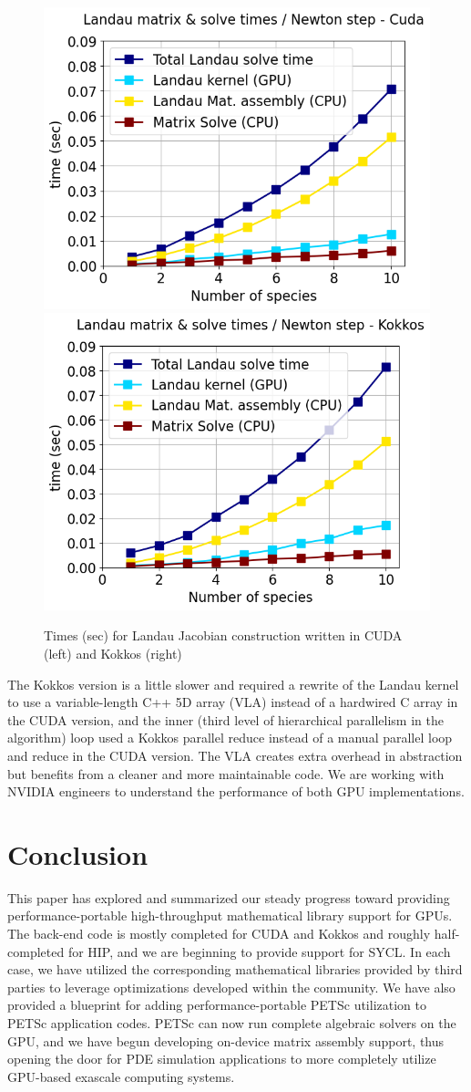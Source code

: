 \documentclass[10pt,journal,compsoc]{IEEEtran}
\begin{document}
\begin{figure}[ht]
\begin{center}
\includegraphics[width=.48\linewidth]{./landau_time_species_cuda.png}
\includegraphics[width=.48\linewidth]{./landau_time_species_kokkos.png}
\caption{Times (sec) for Landau Jacobian construction written in CUDA (left) and Kokkos (right)}
\label{fig:landau}
\end{center}
\end{figure}
The Kokkos version is a little slower and required a rewrite of the Landau kernel to use a variable-length C++ 5D array (VLA) instead of a hardwired C array in the CUDA version, and the inner (third level of hierarchical parallelism in the algorithm) loop used a Kokkos parallel reduce instead of a manual parallel loop and reduce in the CUDA version.
The VLA creates extra overhead in abstraction but benefits from a cleaner and more maintainable code.
We are  working with NVIDIA engineers to understand the performance of both GPU implementations.


\section{Conclusion}
This paper has explored and summarized our steady progress toward providing
performance-portable high-throughput mathematical library support for GPUs. The back-end code is mostly completed for CUDA and
Kokkos and roughly half-completed for HIP, and we are beginning to provide support for
SYCL. In each case, we have utilized the corresponding mathematical libraries provided by third parties to leverage optimizations developed within the community. We
have also provided a blueprint for adding performance-portable PETSc utilization to
PETSc application codes. PETSc can now run complete algebraic solvers on the GPU, and we have begun developing on-device
matrix assembly support, thus opening the door for PDE simulation applications to more completely utilize GPU-based exascale computing systems.
\end{document}
